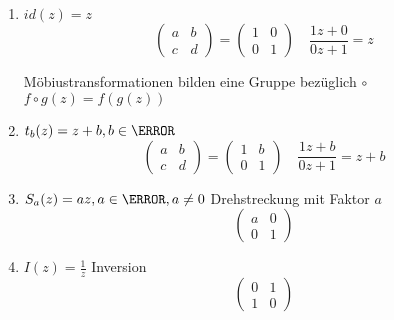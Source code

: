 \begin{bsp*}
	\begin{enumerate}[label = \arabic*)]
		\item $id(z) = z$
			\[ \begin{pmatrix} a & b \\ c & d \end{pmatrix} = \begin{pmatrix} 1 & 0 \\ 0 & 1 \end{pmatrix} \quad \frac{1z + 0}{0z + 1} = z \]
			\begin{bem}
				Möbiustransformationen bilden eine Gruppe bezüglich $\circ$ $f \circ g(z) = f(g(z))$
			\end{bem}
		\item $t_b(z) = z + b , b \in \C$
			\[ \begin{pmatrix} a & b \\ c & d \end{pmatrix} = \begin{pmatrix} 1 & b \\ 0 & 1 \end{pmatrix} \quad \frac{1z + b}{0z + 1} = z + b \]
		\item $S_a(z) = az , a \in \C , a \neq 0$ Drehstreckung mit Faktor $a$ \\
			\[ \begin{pmatrix} a & 0 \\ 0 & 1 \end{pmatrix} \]
		\item $I(z) = \frac{1}{z}$ Inversion
			\[ \begin{pmatrix} 0 & 1 \\ 1 & 0 \end{pmatrix} \]
	\end{enumerate}
\end{bsp*}
